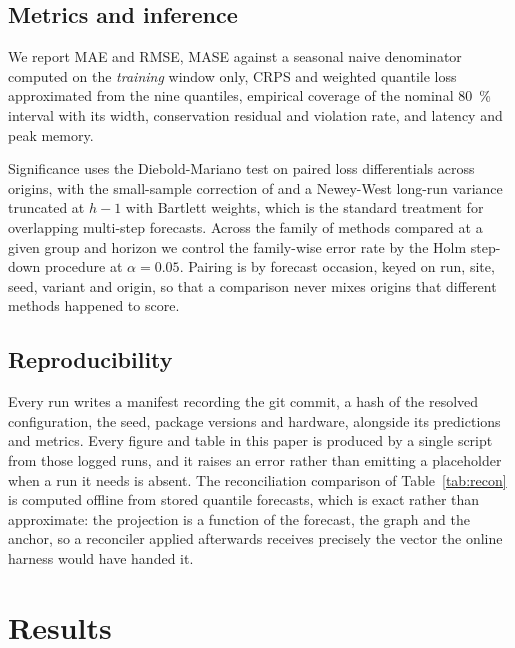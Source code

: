 \documentclass[11pt]{article}
\theoremstyle{plain}
\theoremstyle{definition}
\theoremstyle{remark}
\begin{document}
\subsection{Metrics and inference}
\label{sec:metrics}

We report MAE and RMSE, MASE against a seasonal naive denominator computed on the \emph{training} window only, CRPS and weighted quantile loss approximated from the nine quantiles, empirical coverage of the nominal \SI{80}{\percent} interval with its width, conservation residual and violation rate, and latency and peak memory.

Significance uses the Diebold-Mariano test \citep{diebold1995} on paired loss differentials across origins, with the small-sample correction of \citet{harvey1997} and a Newey-West long-run variance \citep{newey1987} truncated at $h-1$ with Bartlett weights, which is the standard treatment for overlapping multi-step forecasts. Across the family of methods compared at a given group and horizon we control the family-wise error rate by the Holm step-down procedure \citep{holm1979} at $\alpha=0.05$. Pairing is by forecast occasion, keyed on run, site, seed, variant and origin, so that a comparison never mixes origins that different methods happened to score.

\subsection{Reproducibility}

Every run writes a manifest recording the git commit, a hash of the resolved configuration, the seed, package versions and hardware, alongside its predictions and metrics. Every figure and table in this paper is produced by a single script from those logged runs, and it raises an error rather than emitting a placeholder when a run it needs is absent. The reconciliation comparison of Table~\ref{tab:recon} is computed offline from stored quantile forecasts, which is exact rather than approximate: the projection is a function of the forecast, the graph and the anchor, so a reconciler applied afterwards receives precisely the vector the online harness would have handed it.

\section{Results}
\label{sec:results}
\end{document}
